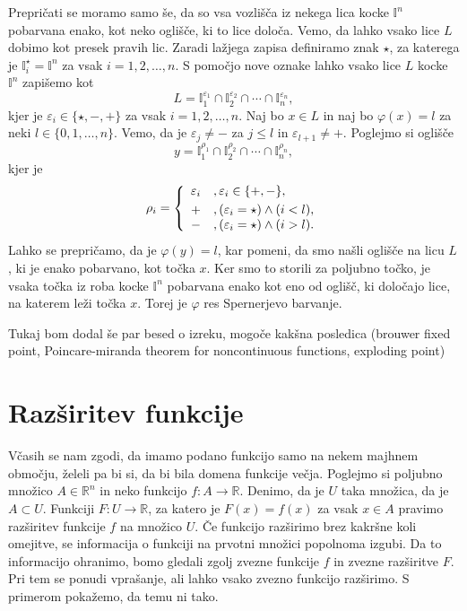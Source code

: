 \documentclass[mat1]{fmfdelo}
\newcommand{\R}{\mathbb R}
\newcommand{\I}{\mathbb I}
\newcommand{\0}{\underline{0}}
\begin{document}
\begin{dokaz}
Prepričati se moramo samo še, da so vsa vozlišča iz nekega lica kocke $\I^n$ pobarvana enako, kot neko oglišče, ki to lice določa. Vemo, da lahko vsako lice $L$ dobimo kot presek pravih lic. Zaradi lažjega zapisa definiramo znak $\star$, za katerega je $\I_i^{\star} = \I^n$ za vsak $i = 1, 2, \dots, n$. S pomočjo nove oznake lahko vsako lice $L$ kocke $\I^n$ zapišemo kot 
$$L = \I_1^{\varepsilon_1} \cap \I_2^{\varepsilon_2} \cap \cdots \cap \I_n^{\varepsilon_n},$$
kjer je $\varepsilon_i \in \{ \star, -, + \}$ za vsak $i = 1, 2, \dots, n$. Naj bo $x \in L$ in naj bo $\varphi (x) = l$ za neki $l \in \{ 0, 1, \dots, n \}$. Vemo, da je $\varepsilon_j \neq -$ za $j \leq l$ in $\varepsilon_{l+1} \neq +$. Poglejmo si oglišče 
$$y = \I_1^{\rho_1} \cap \I_2^{\rho_2} \cap \cdots \cap \I_n^{\rho_n},$$
kjer je
\[  \rho_i =  \left\{
\begin{array}{cl}\vspace{3pt}
	\varepsilon_i &, \varepsilon_i \in \{ +, - \},\\
	+ &, (\varepsilon_i = \star) \land (i < l), \\
	- &, (\varepsilon_i = \star) \land (i > l). \\
\end{array} 
\right. \]
Lahko se prepričamo, da je $\varphi (y) = l$, kar pomeni, da smo našli oglišče na licu $L$, ki je enako pobarvano, kot točka $x$. Ker smo to storili za poljubno točko, je vsaka točka iz roba kocke $\I^n$ pobarvana enako kot eno od oglišč, ki določajo lice, na katerem leži točka $x$. Torej je $\varphi$ res Spernerjevo barvanje.
\end{dokaz}

Tukaj bom dodal še par besed o izreku, mogoče kakšna posledica (brouwer fixed point, Poincare-miranda theorem for noncontinuous functions, exploding point)


\section{Razširitev funkcije}\label{raz:siritev}
Včasih se nam zgodi, da imamo podano funkcijo samo na nekem majhnem območju, želeli pa bi si, da bi bila domena funkcije večja. Poglejmo si poljubno množico $A \in \R^n$ in neko funkcijo $f : A \to \R$. Denimo, da je $U$ taka množica, da je $A \subset U$. Funkciji $F : U \to \R$, za katero je $F(x) = f(x)$ za vsak $x \in A$ pravimo razširitev funkcije $f$ na množico $U$. Če funkcijo razširimo brez kakršne koli omejitve, se informacija o funkciji na prvotni množici popolnoma izgubi. Da to informacijo ohranimo, bomo gledali zgolj zvezne funkcije $f$ in zvezne razširitve $F$. Pri tem se ponudi vprašanje, ali lahko vsako zvezno funkcijo razširimo. S primerom pokažemo, da temu ni tako.
\end{document}
